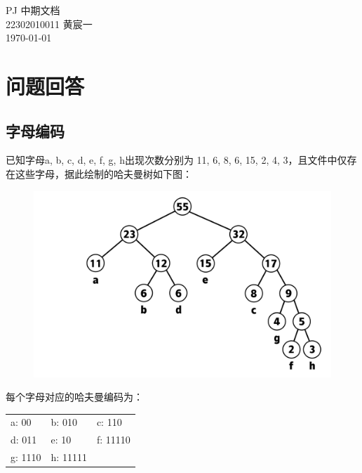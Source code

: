\documentclass[11pt,a4paper]{article}
\begin{document}
\pagestyle{empty}
\begin{titlepage}
    \vspace*{\fill}
    \begin{center}
        \Huge{PJ 中期文档}\\[0.5cm]
        \Large{22302010011 黄宸一}\\[0.4cm]
        \today
    \end{center}
    \vspace*{\fill}
\end{titlepage}
\section*{问题回答}
\subsection*{字母编码}
\par{已知字母a, b, c, d, e, f, g, h出现次数分别为 11, 6, 8, 6, 15, 2, 4, 3，且文件中仅存在这些字母，据此绘制的哈夫曼树如下图：}
\begin{figure}[H]
    \centering
    \includegraphics[width=0.7\linewidth]{1.png}
\end{figure}
\par{每个字母对应的哈夫曼编码为：}
\begin{table}[h!]
    \begin{center}
        \begin{tabular}{|l|l|l|} %
            a: 00   & b: 010   & c: 110   \\
            d: 011  & e: 10    & f: 11110 \\
            g: 1110 & h: 11111 &          \\
        \end{tabular}
    \end{center}
\end{table}
\end{document}
